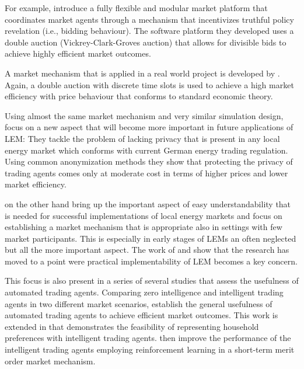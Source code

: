 For example, \citet{Lamparter:2010} introduce a fully flexible and modular market platform that coordinates market agents through a mechanism that incentivizes truthful policy revelation (i.e., bidding behaviour). The software platform they developed uses a double auction (Vickrey-Clark-Groves auction) that allows for divisible bids to achieve highly efficient market outcomes.

A market mechanism that is applied in a real world project is developed by \citet{Ilic:2012}. Again, a double auction with discrete time slots is used to achieve a high market efficiency with price behaviour that conforms to standard economic theory.

Using almost the same market mechanism and very similar simulation design, \citet{Buchmann:2013} focus on a new aspect that will become more important in future applications of LEM: They tackle the problem of lacking privacy that is present in any local energy market which conforms with current German energy trading regulation. Using common anonymization methods they show that protecting the privacy of trading agents comes only at moderate cost in terms of higher prices and lower market efficiency.

\citet{Rosen:2013} on the other hand bring up the important aspect of easy understandability that is needed for successful implementations of local energy markets and focus on establishing a market mechanism that is appropriate also in settings with few market participants. This is especially in early stages of LEMs an often neglected but all the more important aspect. The work of \citet{Buchmann:2013} and \citet{Rosen:2013} show that the research has moved to a point were practical implementability of LEM becomes a key concern.

This focus is also present in a series of several studies that assess the usefulness of automated trading agents. Comparing zero intelligence and intelligent trading agents in two different market scenarios, \citet{Mengelkamp:2017:Trading} establish the general usefulness of automated trading agents to achieve efficient market outcomes. This work is extended in \citet{Mengelkamp:2018:Clustering} that demonstrates the feasibility of representing household preferences with intelligent trading agents. \citet{Mengelkamp:2018c} then improve the performance of the intelligent trading agents employing reinforcement learning in a short-term merit order market mechanism.



